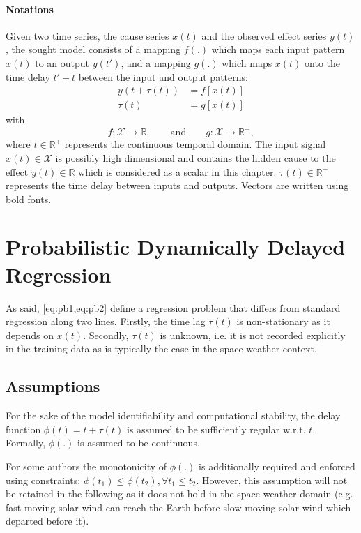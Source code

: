 \paragraph{Notations}
Given two time series, the cause series $x(t)$ and the observed effect series $y(t)$, the sought 
model consists of a mapping $f(.)$ which maps each input pattern $x(t)$ to an output $y(t')$, and a 
mapping $g(.)$ which maps $x(t)$ onto the time delay $t'-t$ between the input and output patterns:
%
\begin{align}
y(t + \tau(t)) & = f[x(t)]\label{eq:pb1}\\
\tau(t) & = g[x(t)]\label{eq:pb2} 
\end{align}
with
\[
f: \mathcal{X}  \rightarrow \mathbb{R},\qquad\text{and}\qquad
g: \mathcal{X}  \rightarrow \mathbb{R}^{+},
\]
where $t \in \mathbb{R}^{+}$ represents the continuous temporal domain. The input signal 
$x(t)\in \mathcal{X}$ is possibly high dimensional and contains the hidden cause to 
the effect $y(t)\in\mathbb{R}$ which is considered as a scalar in this chapter. 
$\tau(t)\in \mathbb{R}^+$ represents the time delay between inputs and outputs.
Vectors are written using bold fonts.

\section{Probabilistic Dynamically Delayed Regression}\label{sec:dtlrformulation}
As said, \cref{eq:pb1,eq:pb2} define a regression problem that differs from standard regression 
along two lines. Firstly, the time lag $\tau(t)$ is non-stationary as it depends on $x(t)$. 
Secondly, $\tau(t)$ is unknown, i.e. it is not recorded explicitly in the training data as is 
typically the case in the space weather context. 

\subsection{Assumptions}

For the sake of the model identifiability and computational stability, the delay function 
$\phi(t) = t + \tau(t)$ is assumed to be sufficiently regular w.r.t. $t$. Formally, $\phi(.)$ 
is assumed to be continuous.

For some authors \citep{ZHOU2006195} the monotonicity of $\phi(.)$ is additionally required and 
enforced using constraints: $\phi(t_1) \leq \phi(t_2), \forall t_1 \leq t_2$. However, this 
assumption will not be retained in the following as it does not hold in the space weather domain 
(e.g. fast moving solar wind can reach the Earth before slow moving solar wind which departed 
before it). 

